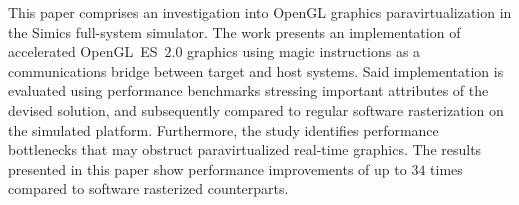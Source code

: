 This paper comprises an investigation into OpenGL graphics paravirtualization in the Simics full-system simulator.
The work presents an implementation of accelerated OpenGL~ES~$2.0$ graphics using magic instructions as a communications bridge between target and host systems.
Said implementation is evaluated using performance benchmarks stressing important attributes of the devised solution, and subsequently compared to regular software rasterization on the simulated platform.
Furthermore, the study identifies performance bottlenecks that may obstruct paravirtualized real-time graphics.
The results presented in this paper show performance improvements of up to $34$ times compared to software rasterized counterparts.
